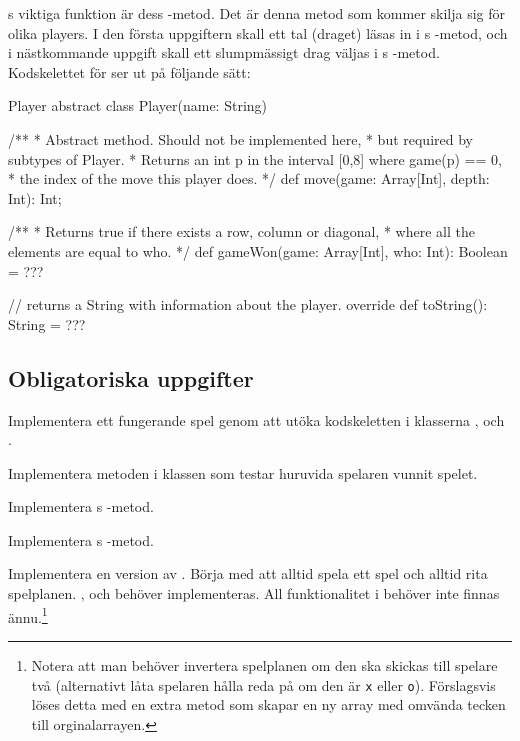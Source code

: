 s viktiga funktion är dess -metod. Det är denna metod som kommer skilja sig för olika players. I den första uppgiftern skall ett tal (draget) läsas in i s -metod, och i nästkommande uppgift skall ett slumpmässigt drag väljas i s -metod.
Kodskelettet för  ser ut på följande sätt:
\begin{ScalaSpec}{Player}
abstract class Player(name: String) {
	
	/**
	 * Abstract method. Should not be implemented here, 
	 * but required by subtypes of Player.
	 * Returns an int p in the interval [0,8] where game(p) == 0,
	 * the index of the move this player does. 
	 */
	def move(game: Array[Int], depth: Int): Int;
	
	/**
	 * Returns true if there exists a row, column or diagonal,
	 * where all the elements are equal to who.
	 */
	def gameWon(game: Array[Int], who: Int): Boolean = ???
	
	// returns a String with information about the player.
	override def toString(): String = ???
}
\end{ScalaSpec}

 
\subsection{Obligatoriska uppgifter}

\Task Implementera ett fungerande spel genom att utöka kodskeletten i klasserna ,  och .

\Subtask Implementera metoden  i klassen  som testar huruvida spelaren  vunnit spelet.

\Subtask Implementera s -metod.

\Subtask Implementera s -metod.

\Subtask Implementera en version av . Börja med att alltid spela ett spel och alltid rita spelplanen. ,  och  behöver implementeras. All funktionalitet i  behöver inte finnas ännu.\footnote{Notera att man behöver invertera spelplanen om den ska skickas till spelare två (alternativt låta spelaren hålla reda på om den är \texttt{x} eller \texttt{o}). Förslagsvis löses detta med en extra metod  som skapar en ny array med omvända tecken till orginalarrayen.}

\Task {}

